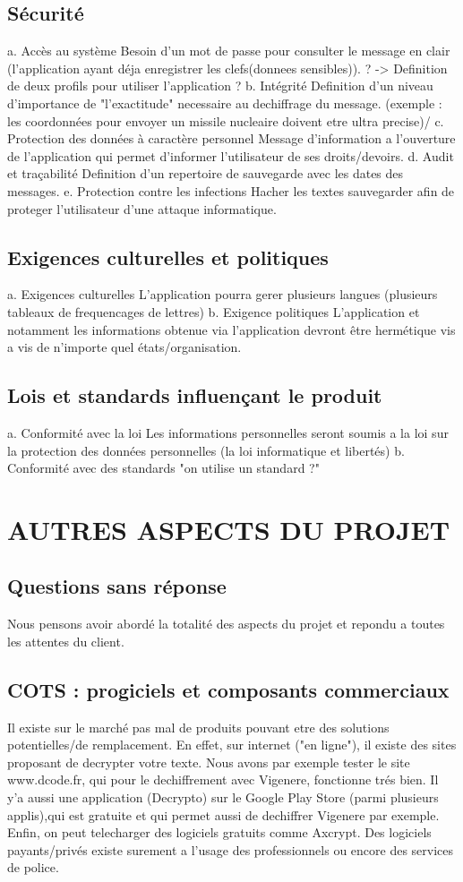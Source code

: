 \documentclass[a4]{article}
\begin{document}
		\subsection{Sécurité}
			a. Accès au système
Besoin d'un mot de passe pour consulter le message en clair (l'application ayant déja enregistrer les clefs(donnees sensibles)). ?
-> Definition de deux profils pour utiliser l'application ?
			b. Intégrité
Definition d'un niveau d'importance de "l'exactitude" necessaire au dechiffrage du message.
(exemple : les coordonnées pour envoyer un missile nucleaire doivent etre ultra precise)/
			c. Protection des données à caractère personnel
Message d'information a l'ouverture de l'application qui permet d'informer l'utilisateur de ses droits/devoirs.
			d. Audit et traçabilité
Definition d'un repertoire de sauvegarde avec les dates des messages.
			e. Protection contre les infections
Hacher les textes sauvegarder afin de proteger l'utilisateur d'une attaque informatique.
		\subsection{Exigences culturelles et politiques}
			a. Exigences culturelles
L'application pourra gerer plusieurs langues (plusieurs tableaux de frequencages de lettres)
			b. Exigence politiques
L'application et notamment les informations obtenue via l'application devront être hermétique vis a vis de n'importe quel états/organisation.
		\subsection{Lois et standards influençant le produit}
		a. Conformité avec la loi
Les informations personnelles seront soumis a la loi sur la protection des données
personnelles (la loi informatique et libertés)
		b. Conformité avec des standards
		"on utilise un standard ?"
	\section{AUTRES ASPECTS DU PROJET}
		\subsection{Questions sans réponse}
		Nous pensons avoir abordé la totalité des aspects du projet et repondu a toutes les attentes du client.
		\subsection{COTS : progiciels et composants commerciaux}
		Il existe sur le marché pas mal de produits pouvant etre des solutions potentielles/de remplacement. En effet, sur internet
		("en ligne"), il existe des sites proposant de decrypter votre texte. Nous avons par exemple tester le site www.dcode.fr, qui
		pour le dechiffrement avec Vigenere, fonctionne trés bien.
		Il y'a aussi une application (Decrypto) sur le Google Play Store (parmi plusieurs applis),qui est gratuite et qui permet aussi de dechiffrer Vigenere par exemple.
		Enfin, on peut telecharger des logiciels gratuits comme Axcrypt. Des logiciels payants/privés existe surement a l'usage des
		professionnels ou encore des services de police.
\end{document}
